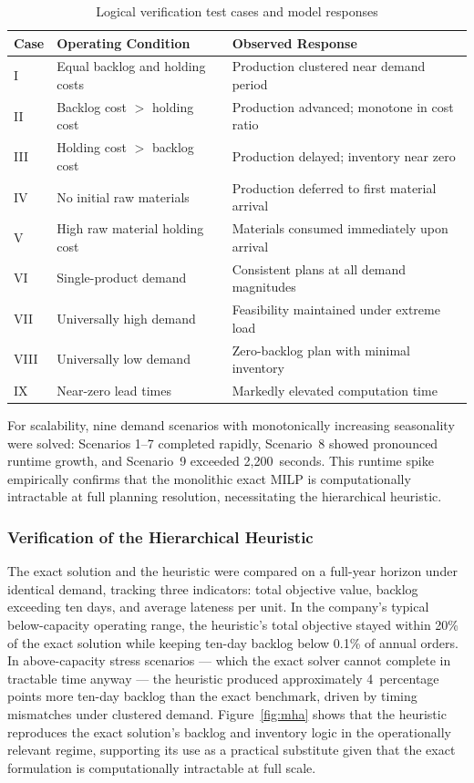 \documentclass[11pt]{article}
\begin{document}
\begin{table}[h!]
\centering
\caption{Logical verification test cases and model responses}
\label{tab:verification_cases}
\begin{tabular}{@{}llp{6cm}@{}}
\toprule
Case & Operating Condition & Observed Response \\ \midrule
I   & Equal backlog and holding costs & Production clustered near demand period \\
II  & Backlog cost $>$ holding cost & Production advanced; monotone in cost ratio \\
III & Holding cost $>$ backlog cost & Production delayed; inventory near zero \\
IV  & No initial raw materials & Production deferred to first material arrival \\
V   & High raw material holding cost & Materials consumed immediately upon arrival \\
VI  & Single-product demand & Consistent plans at all demand magnitudes \\
VII & Universally high demand & Feasibility maintained under extreme load \\
VIII& Universally low demand & Zero-backlog plan with minimal inventory \\
IX  & Near-zero lead times & Markedly elevated computation time \\ \bottomrule
\end{tabular}
\end{table}

For scalability, nine demand scenarios with monotonically increasing seasonality were solved: Scenarios 1--7 completed rapidly, Scenario~8 showed pronounced runtime growth, and Scenario~9 exceeded 2,200~seconds. This runtime spike empirically confirms that the monolithic exact MILP is computationally intractable at full planning resolution, necessitating the hierarchical heuristic.



\subsubsection{Verification of the Hierarchical Heuristic}

The exact solution and the heuristic were compared on a full-year horizon under identical demand, tracking three indicators: total objective value, backlog exceeding ten days, and average lateness per unit. In the company’s typical below-capacity operating range, the heuristic’s total objective stayed within 20\% of the exact solution while keeping ten-day backlog below 0.1\% of annual orders. In above-capacity stress scenarios --- which the exact solver cannot complete in tractable time anyway --- the heuristic produced approximately 4~percentage points more ten-day backlog than the exact benchmark, driven by timing mismatches under clustered demand. Figure~\ref{fig:mha} shows that the heuristic reproduces the exact solution’s backlog and inventory logic in the operationally relevant regime, supporting its use as a practical substitute given that the exact formulation is computationally intractable at full scale.\\
\end{document}
